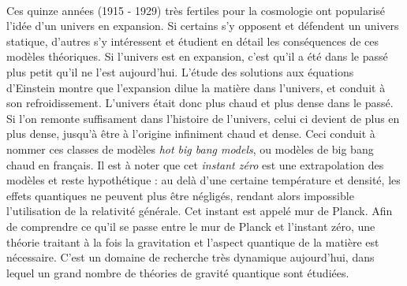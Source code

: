 \paragraph{}
Ces quinze années (1915 - 1929) très fertiles pour la cosmologie ont popularisé l'idée d'un univers en expansion. Si certains s'y opposent et défendent un univers statique, d'autres s'y intéressent et étudient en détail les conséquences de ces modèles théoriques. Si l'univers est en expansion, c'est qu'il a été dans le passé plus petit qu'il ne l'est aujourd'hui. L'étude des solutions aux équations d'Einstein montre que l'expansion dilue la matière dans l'univers, et conduit à son refroidissement. L'univers était donc plus chaud et plus dense dans le passé. Si l'on remonte suffisament dans l'histoire de l'univers, celui ci devient de plus en plus dense, jusqu'à être à l'origine infiniment chaud et dense. Ceci conduit à nommer ces classes de modèles \emph{hot big bang models}, ou modèles de big bang chaud en français. Il est à noter que cet \emph{instant zéro} est une extrapolation des modèles et reste hypothétique : au delà d'une certaine température et densité, les effets quantiques ne peuvent plus être négligés, rendant alors impossible l'utilisation de la relativité générale. Cet instant est appelé mur de Planck. Afin de comprendre ce qu'il se passe entre le mur de Planck et l'instant zéro, une théorie traitant à la fois la gravitation et l'aspect quantique de la matière est nécessaire. C'est un domaine de recherche très dynamique aujourd'hui, dans lequel un grand nombre de théories de gravité quantique sont étudiées.

